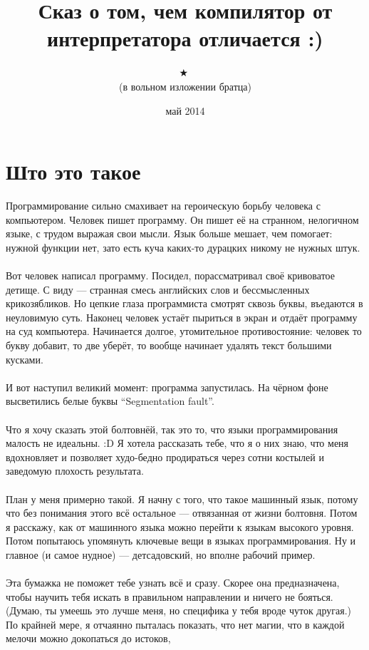 \documentclass[11pt]{book}
\title{
\small{\textleaf}
\huge{\textleaf}
\huge{\quad}
\large{Сказ о том, чем компилятор от интерпретатора отличается :)}
\huge{\quad}
\huge{\textleaf}
\small{\textleaf}
}
\author{
\small{\textborn} \ 
\small{\APLstar} \ 
\huge{\textborn} \ 
\huge{\APLstar} \ 
\Huge{$\bigstar$} \ 
\huge{\APLstar} \ 
\huge{\textborn} \ 
\small{\APLstar} \ 
\small{\textborn}
\\
\Large (в вольном изложении братца)
\\
\huge{\Bicycle}
}
\date{май 2014}
\begin{document}
\maketitle
\pagebreak

\section*{Што это такое}
Программирование сильно смахивает на героическую борьбу человека с компьютером.
Человек пишет программу. Он пишет её на странном, нелогичном языке, с трудом выражая
свои мысли. Язык больше мешает, чем помогает: нужной функции нет, зато есть
куча каких-то дурацких никому не нужных штук.
\\ \\
Вот человек написал программу. Посидел, порассматривал своё кривоватое детище.
С виду --- странная смесь английских слов и бессмысленных крикозябликов.
Но цепкие глаза программиста смотрят сквозь буквы, въедаются
в неуловимую суть. Наконец человек устаёт пыриться в экран и отдаёт программу
на суд компьютера. Начинается долгое, утомительное противостояние: человек
то букву добавит, то две уберёт, то вообще начинает удалять текст большими кусками.
\\ \\
И вот наступил великий момент: программа запустилась. На чёрном фоне
высветились белые буквы ``Segmentation fault''.
\\ \\
Что я хочу сказать этой болтовнёй, так это то, что языки программирования малость не идеальны. :D
Я хотела рассказать тебе, что я о них знаю, что меня вдохновляет
и позволяет худо-бедно продираться через сотни костылей и заведомую плохость результата.
\\ \\
План у меня примерно такой.
Я начну с того, что такое машинный язык, потому что без понимания этого всё остальное --- отвязанная от жизни болтовня.
Потом я расскажу, как от машинного языка можно перейти к языкам высокого уровня.
Потом попытаюсь упомянуть ключевые вещи в языках программирования.
Ну и главное (и самое нудное) --- детсадовский, но вполне рабочий пример.
\\ \\
Эта бумажка не поможет тебе узнать всё и сразу.
Скорее она предназначена, чтобы научить тебя искать в правильном направлении и ничего не бояться.
(Думаю, ты умеешь это лучше меня, но специфика у тебя вроде чуток другая.)
По крайней мере, я отчаянно пыталась показать, что нет магии, что в каждой мелочи можно докопаться до истоков,
\end{document}

